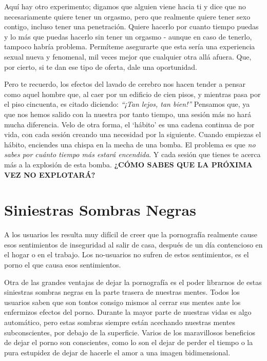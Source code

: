 \documentclass[
  openany]{book}
\begin{document}
Aquí hay otro experimento; digamos que alguien viene hacia ti y dice que no necesariamente quiere tener un orgasmo, pero que realmente quiere tener sexo contigo, incluso tener una penetración. Quiere hacerlo por cuanto tiempo puedas y lo más que puedas hacerlo sin tener un orgasmo - aunque en caso de tenerlo, tampoco habría problema. Permíteme asegurarte que esta sería una experiencia sexual nueva y fenomenal, mil veces mejor que cualquier otra allá afuera. Que, por cierto, si te dan ese tipo de oferta, dale una oportunidad.

Pero te recuerdo, los efectos del lavado de cerebro nos hacen tender a pensar como aquel hombre que, al caer por un edificio de cien pisos, y mientras pasa por el piso cincuenta, es citado diciendo: \emph{``¡Tan lejos, tan bien!''} Pensamos que, ya que nos hemos salido con la nuestra por tanto tiempo, una sesión más no hará mucha diferencia. Velo de otra forma, el `hábito' es una cadena continua de por vida, con cada sesión creando una necesidad por la siguiente. Cuando empiezas el hábito, enciendes una chispa en la mecha de una bomba. El problema es que \emph{no sabes por cuánto tiempo más estará encendida}. Y cada sesión que tienes te acerca más a la explosión de esta bomba. \textbf{¿CÓMO SABES QUE LA PRÓXIMA VEZ NO EXPLOTARÁ?}

\hypertarget{siniestras-sombras-negras}{%
\section{Siniestras Sombras Negras}\label{siniestras-sombras-negras}}

A los usuarios les resulta muy difícil de creer que la pornografía realmente cause esos sentimientos de inseguridad al salir de casa, después de un día contencioso en el hogar o en el trabajo. Los no-usuarios no sufren de estos sentimientos, es el porno el que causa esos sentimientos.

Otra de las grandes ventajas de dejar la pornografía es el poder librarnos de estas siniestras sombras negras en la parte trasera de nuestras mentes. Todos los usuarios saben que son tontos consigo mismos al cerrar sus mentes ante los enfermizos efectos del porno. Durante la mayor parte de nuestras vidas es algo automático, pero estas sombras siempre están acechando nuestras mentes subconscientes, por debajo de la superficie. Varios de los maravillosos beneficios de dejar el porno son conscientes, como lo son el dejar de perder el tiempo o la pura estupidez de dejar de hacerle el amor a una imagen bidimensional.
\end{document}
